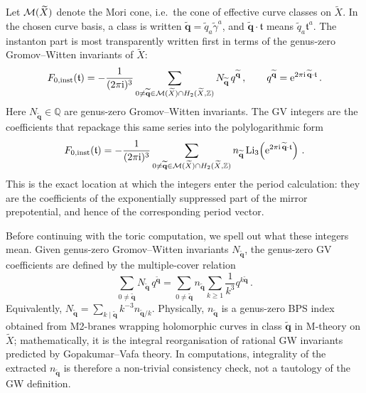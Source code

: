 Let $\mathcal{M}(\widetilde X)$ denote the Mori cone, i.e.\ the cone of
effective curve classes on $\widetilde X$.  In the chosen curve basis,
a class is written
$\widetilde{\mathbf q}=\widetilde q_a\widetilde\gamma^{a}$, and
$\widetilde{\mathbf q}\cdot\mathfrak t$ means
$\widetilde q_a\mathfrak t^a$.  The instanton part is most
transparently written first in terms of the genus-zero
Gromov--Witten invariants of $\widetilde X$:
\begin{equation}\label{eq:F-inst-GW}
    F_{0,{\rm inst}}(\mathfrak t)
    =
    -\frac{1}{(2\pi\mathrm{i})^3}
    \sum_{0\ne\widetilde{\mathbf q}
          \in\mathcal{M}(\widetilde X)\cap H_2(\widetilde X,\mathbb Z)}
    N_{\widetilde{\mathbf q}}\,
    q^{\widetilde{\mathbf q}}\, ,
    \qquad
    q^{\widetilde{\mathbf q}}
    =
    \mathrm{e}^{2\pi\mathrm{i}\,
      \widetilde{\mathbf q}\cdot\mathfrak t}\, .
\end{equation}
Here $N_{\widetilde{\mathbf q}}\in\mathbb Q$ are genus-zero
Gromov--Witten invariants.  The GV integers are the coefficients that
repackage this same series into the polylogarithmic form
\begin{equation}\label{eq:F-inst}
    F_{0,{\rm inst}}(\mathfrak t)
    =
    -\frac{1}{(2\pi\mathrm{i})^3}
    \sum_{0\ne\widetilde{\mathbf q}
          \in\mathcal{M}(\widetilde X)\cap H_2(\widetilde X,\mathbb Z)}
    n_{\widetilde{\mathbf q}}\,
    \mathrm{Li}_3\!\left(
      \mathrm{e}^{2\pi\mathrm{i}\,
      \widetilde{\mathbf q}\cdot\mathfrak t}
    \right)\, .
\end{equation}
This is the exact location at which the integers enter the period
calculation: they are the coefficients of the exponentially suppressed
part of the mirror prepotential, and hence of the corresponding
period vector.

Before continuing with the toric computation, we spell out what these
integers mean.  Given genus-zero Gromov--Witten invariants
$N_{\widetilde{\mathbf q}}$, the genus-zero GV coefficients are
defined by the multiple-cover relation
\begin{equation}\label{eq:L2-mult-cover}
    \sum_{0\ne\widetilde{\mathbf q}}
    N_{\widetilde{\mathbf q}}\,q^{\widetilde{\mathbf q}}
    =
    \sum_{0\ne\widetilde{\mathbf q}}
    n_{\widetilde{\mathbf q}}
    \sum_{k\geq1}\frac{1}{k^3}
    q^{k\widetilde{\mathbf q}}\, .
\end{equation}
Equivalently,
$N_{\widetilde{\mathbf q}}=\sum_{k\mid\widetilde{\mathbf q}}
k^{-3}n_{\widetilde{\mathbf q}/k}$.  Physically,
$n_{\widetilde{\mathbf q}}$ is a genus-zero BPS index obtained from
M2-branes wrapping holomorphic curves in class
$\widetilde{\mathbf q}$ in M-theory on $\widetilde X$; mathematically,
it is the integral reorganisation of rational GW invariants predicted
by Gopakumar--Vafa theory.  In computations, integrality of the
extracted $n_{\widetilde{\mathbf q}}$ is therefore a non-trivial
consistency check, not a tautology of the GW definition.

